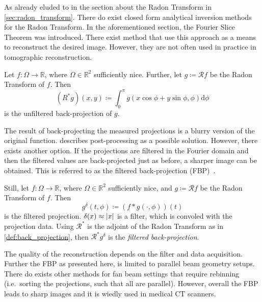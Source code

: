 As already eluded to in the section about the Radon Transform in \autoref{sec:radon_transform}.
There do exist closed form analytical inversion methods for the Radon Transform. In the
aforementioned section, the Fourier Slice Theorem was introduced. There exist method that use this
approach as a means to reconstruct the desired image. However, they are not often used in practice
in tomographic reconstruction.

\begin{definition}\label{def:back_projection}
	Let \(f\colon \Omega \to \mathbb{R}\), where \(\Omega \in \mathbb{R}^2\) sufficiently nice.
	Further, let \(g \coloneq \mathscr{R}f\) be the Radon Transform of \(f\). Then
	\[ (R^\ast g)(x, y) \coloneq \int_0^\pi g(x\cos \phi + y \sin\phi, \phi) \mathrm{d}\phi \]
	is the unfiltered back-projection of \(g\).
\end{definition}


The result of back-projecting the measured projections is a blurry version of the original function.
\citeauthor{buzug_computed_2008} describes post-processing as a possible solution. However, there
exists another option. If the projections are filtered in the Fourier domain and then the filtered
values are back-projected just as before, a sharper image can be obtained. This is referred to as
the filtered back-projection (FBP)~\cite{ramachandran_three-dimensional_1971}.

\begin{definition}\label{def:filtered_back_projection}
	Still, let \(f\colon \Omega \to \mathbb{R}\), where \(\Omega \in \mathbb{R}^2\) sufficiently
	nice, and \(g \coloneq \mathscr{R}f\) be the Radon Transform of \(f\). Then
	\[ g^\delta(t, \phi) \coloneq (f \ast g(\cdot, \phi))(t) \]
	is the filtered projection. \(\delta(x) \approx \lvert x\rvert\) is a filter, which is convoled
	with the projection data. Using \(\mathscr{R}^\ast\) is the adjoint of the Radon Transform
	as in \autoref{def:back_projection}, then \(\mathscr{R}^\ast g^\delta\) is the
	\textit{filtered back-projection}.
\end{definition}

The quality of the reconstruction depends on the filter and data acquisition. Further the FBP as
presented here, is limited to parallel beam geometry setups. There do exists other methods for fan
beam settings that require rebinning (i.e.\ sorting the projections, such that all are parallel).
However, overall the FBP leads to sharp images and it is wiedly used in medical CT
scanners\cite{pan_why_2009}.

